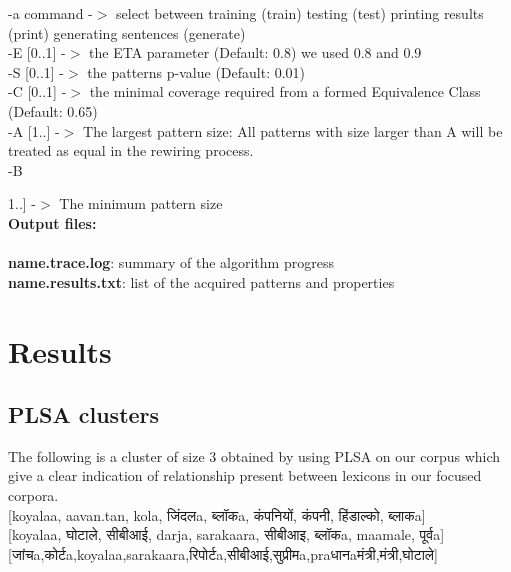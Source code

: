 \documentclass{article}
\begin{document}
-a command     -$>$ select between training (train) testing (test) printing results (print) generating sentences (generate)\\
-E [0..1]      -$>$ the ETA parameter  (Default: 0.8) we used 0.8 and 0.9\\
-S [0..1]      -$>$ the patterns p-value  (Default: 0.01)\\
-C [0..1]      -$>$ the minimal coverage required from a formed Equivalence Class  (Default: 0.65)\\
-A [1..]       -$>$ The largest pattern size: All patterns with size larger than A will be treated as equal in the rewiring process.\\ 
-B {1..]       -$>$ The minimum pattern size\\

{\bf Output files:}\\ \\
\textbf{name.trace.log}: summary of the algorithm progress\\
\textbf{name.results.txt}: list of the acquired patterns and properties

\section{Results}
\subsection{PLSA clusters}
The following is a cluster of size 3 obtained by using PLSA on our corpus which give a clear indication of relationship present 
between lexicons in our focused corpora.
\newline
\\
\newcommand{\saha}[1]{{\sahadeva\textsanskrit{#1}}}
\saha{[koyalaa, aavan.tan, kola, जिंदलa, ब्लॉकa, कंपनियों, कंपनी, हिंडाल्को, ब्लाकa]}\newline 
\\
\saha{[koyalaa, घोटाले, सीबीआई, darja, sarakaara, सीबीआइ, ब्लॉकa, maamale, पूर्वa]}\newline 
\\
\saha{[जांचa,कोर्टa,koyalaa,sarakaara,रिपोर्टa,सीबीआई,सुप्रीमa,praधानaमंत्री,मंत्री,घोटाले]}

}
\end{document}
